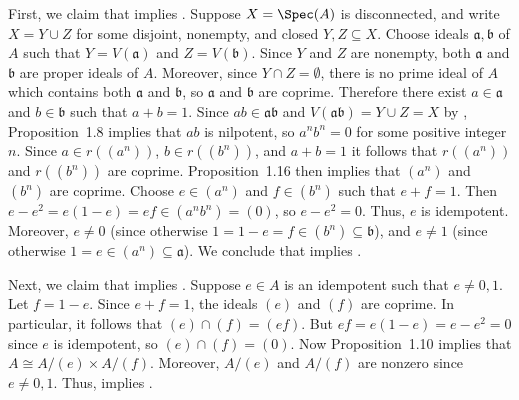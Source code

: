 \begin{solution}
First, we claim that  implies .
Suppose \(X = \Spec(A)\) is disconnected, and write \(X = Y \cup Z\) for some disjoint, nonempty, and closed \(Y, Z \subseteq X\).
Choose ideals \(\mathfrak{a}, \mathfrak{b}\) of \(A\) such that \(Y = V(\mathfrak{a})\) and \(Z = V(\mathfrak{b})\).
Since \(Y\) and \(Z\) are nonempty, both \(\mathfrak{a}\) and \(\mathfrak{b}\) are proper ideals of \(A\).
Moreover, since \(Y \cap Z = \emptyset\), there is no prime ideal of \(A\) which contains both \(\mathfrak{a}\) and \(\mathfrak{b}\), so \(\mathfrak{a}\) and \(\mathfrak{b}\) are coprime.
Therefore there exist \(a \in \mathfrak{a}\) and \(b \in \mathfrak{b}\) such that \(a + b = 1\).
Since \(a b \in \mathfrak{a} \mathfrak{b}\) and \(V(\mathfrak{a} \mathfrak{b}) = Y \cup Z = X\) by , Proposition~1.8 implies that \(a b\) is nilpotent, so \(a^n b^n = 0\) for some positive integer \(n\).
Since \(a \in r((a^n))\), \(b \in r((b^n))\), and \(a + b = 1\) it follows that \(r((a^n))\) and \(r((b^n))\) are coprime.
Proposition~1.16 then implies that \((a^n)\) and \((b^n)\) are coprime.
Choose \(e \in (a^n)\) and \(f \in (b^n)\) such that \(e + f = 1\).
Then \(e - e^2 = e (1 - e) = e f \in (a^n b^n) = (0)\), so \(e - e^2 = 0\).
Thus, \(e\) is idempotent.
Moreover, \(e \neq 0\) (since otherwise \(1 = 1 - e = f \in (b^n) \subseteq \mathfrak{b}\)), and \(e \neq 1\) (since otherwise \(1 = e \in (a^n) \subseteq \mathfrak{a}\)).
We conclude that  implies .

Next, we claim that  implies .
Suppose \(e \in A\) is an idempotent such that \(e \neq 0, 1\).
Let \(f = 1 - e\).
Since \(e + f = 1\), the ideals \((e)\) and \((f)\) are coprime.
In particular, it follows that \((e) \cap (f) = (e f)\).
But \(e f = e (1 - e) = e - e^2 = 0\) since \(e\) is idempotent, so \((e) \cap (f) = (0)\).
Now Proposition~1.10 implies that \(A \cong A / (e) \times A / (f)\).
Moreover, \(A / (e)\) and \(A / (f)\) are nonzero since \(e \neq 0, 1\).
Thus,  implies .


\end{solution}